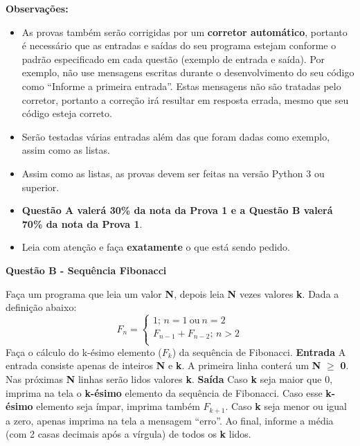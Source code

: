 \documentclass[a4paper, 12pt]{article}
\begin{document}
\textbf{{\large Observações:}}
\begin{itemize}
	\item As provas também serão corrigidas por um \textbf{corretor automático}, portanto é necessário que as entradas e saídas do seu programa estejam conforme o padrão especificado em cada questão (exemplo de entrada e saída). Por exemplo, não use mensagens escritas durante o desenvolvimento do seu código como “Informe a primeira entrada”. Estas mensagens não são tratadas pelo corretor, portanto a correção irá resultar em resposta errada, mesmo que seu código esteja correto.
	\item Serão testadas várias entradas além das que foram dadas como exemplo, assim como as listas.
	\item Assim como as listas, as provas devem ser feitas na versão Python 3 ou superior.
	\item \textbf{Questão A valerá 30\% da nota da Prova 1 e a Questão B valerá 70\% da nota da Prova 1}.
	\item Leia com atenção e faça \textbf{exatamente} o que está sendo pedido.
\end{itemize}
\newpage %
\begin{center}
\textbf{{\Large Questão B - Sequência Fibonacci}}
\end{center}
\vspace{5pt}
Faça um programa que leia um valor \textbf{N}, depois leia \textbf{N} vezes valores \textbf{k}. Dada a definição abaixo:
$$F_n =
		\begin{cases}
			1;\, n = 1\ \textrm{ou}\ n = 2 \\
			F_{n-1} + F_{n-2};\, n > 2 \\
		\end{cases}
$$ 
Faça o cálculo do k-ésimo elemento ($F_k$) da sequência de Fibonacci.
\newline \newline
\textbf{{\large Entrada}} \newline
A entrada consiste apenas de inteiros \textbf{N} e \textbf{k}. A primeira linha conterá um \textbf{N} $\geq$ \textbf{0}. Nas próximas \textbf{N} linhas serão lidos valores \textbf{k}.
\newline \newline
\textbf{{\large Saída}} \newline
Caso \textbf{k} seja maior que 0, imprima na tela o \textbf{k-ésimo} elemento da sequência de Fibonacci. Caso esse \textbf{k-ésimo} elemento seja ímpar, imprima também $F_{k+1}$. Caso \textbf{k} seja menor ou igual a zero, apenas imprima na tela a mensagem ``erro''. Ao final, informe a média (com 2 casas decimais após a vírgula) de todos os \textbf{k} lidos.
\end{document}
